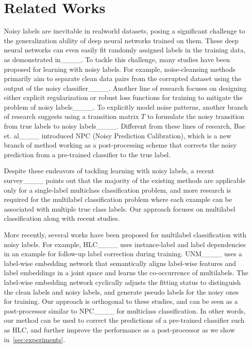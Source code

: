 \section{Related Works}
\label{sec:related}
Noisy labels are inevitable in realworld datasets, posing a significant challenge to the generalization ability of deep neural networks trained on them. These deep neural networks can even easily fit randomly assigned labels in the training data, as demonstrated in____. To tackle this challenge, many studies have been proposed for learning with noisy labels. For example, noise-cleansing methods primarily aim to separate clean data pairs from the corrupted dataset using the output of the noisy classifier____. 
Another line of research focuses on designing either explicit regularization or robust loss functions for training to mitigate the problem of noisy labels____. 
To explicitly model  noise patterns, another branch of research suggests using a transition matrix $T$ to formulate the noisy transition from true labels to noisy labels____. 
Different from these lines of research, Bae et. al____ introduced NPC (Noisy Prediction Calibration), which is a new branch of method working as a post-processing scheme that corrects the noisy prediction from a pre-trained classifier to the true label.

Despite these endeavors of tackling learning with noisy labels, a recent survey____ points out that the majority of the existing methods are applicable only for a
single-label multiclass classification problem, and more research is required for the multilabel classification problem where each example can be associated with multiple true class labels. 
Our approach focuses on multilabel classification along with recent studies.

More recently, several works have been proposed for multilabel classification with noisy labels.
For example, HLC____ uses instance-label and label dependencies in an example for follow-up label correction during training. 
UNM____ uses a label-wise embedding network that semantically aligns label-wise features and label embeddings in a joint space and learns the co-occurrence of multilabels. The label-wise embedding network cyclically adjusts the fitting status to distinguish the clean labels and noisy labels, and generate pseudo labels for the noisy ones for training. 
Our approach is orthogonal to these studies, and can be seen as a post-processor similar to NPC____ for multiclass classification. 
In other words, our method can be used to correct the predictions of a pre-trained classifier such as HLC, and further improve the performance as a post-processor as we show in~\cref{sec:experiments}.